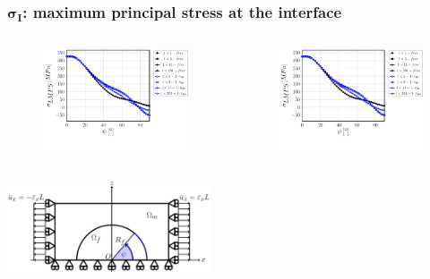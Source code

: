 \documentclass[first,firstsupp,lastsupp,last,hyperref,table]{ETHclass}
\begin{document}
\begin{frame}
\frametitle{\vspace{0.2cm}\small $\mathbf{\sigma_{I}}$: maximum principal stress at the interface}
\vspace{-.75cm}
\centering
\begin{columns}[c]
\centering
\begin{column}{0.5\textwidth}
\centering
\begin{figure}
\centering
\includegraphics[width=\columnwidth]{vf60-nodamage-sigmaI2D-notol.pdf}
\end{figure}
\end{column}
\begin{column}{0.5\textwidth}
\centering
\begin{figure}
\centering
\includegraphics[width=\columnwidth]{vf60-nodamage-sigmaI3D-notol.pdf}
\end{figure}
\end{column}
\end{columns}
\vspace{-0.3cm}
\includegraphics[width=0.45\textwidth]{refAngle.pdf}
\end{frame}
\end{document}
